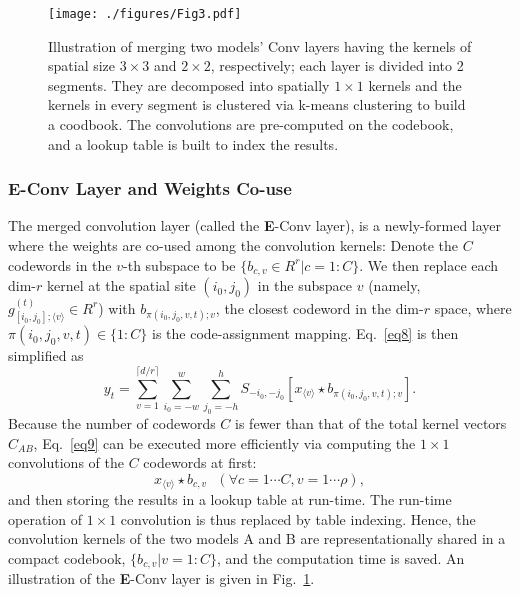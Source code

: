 \documentclass{article}
\begin{document}
	
	\begin{figure}[t]
		\begin{center}
			\texttt{[image: ./figures/Fig3.pdf]}
		\end{center}
		\vspace{-0.3cm}
		\caption{Illustration of merging two models' Conv layers having the kernels of spatial size $3\times3$ and $2\times 2$, respectively; each layer is divided into 2 segments. They are decomposed into spatially $1\times 1$ kernels and the kernels in every segment is clustered via k-means clustering to build a coodbook. The convolutions are pre-computed on the codebook, and a lookup table is built to index the results.}
		\label{fig:decomposition}
	\end{figure}
	
	\subsubsection{E-Conv Layer and Weights Co-use}
	\label{sec:merge}
	The merged convolution layer (called the \textbf{E}-Conv layer), is a newly-formed layer where the weights are co-used among the convolution kernels:
	Denote the $C$ codewords in the $v$-th subspace to be $\{b_{c,v}\in R^r|c=1:C\}$.
	We then replace each dim-$r$ kernel at the spatial site $(i_0,j_0)$ in the subspace $v$ (namely, $g_{[i_0,j_0];\langle v \rangle}^{(t)}\in R^r$) with $b_{\pi(i_0,j_0,v,t);v}$, the closest codeword in the dim-$r$ space, where $\pi(i_0,j_0,v,t)\in\{1:C\}$ is the code-assignment mapping.
	Eq.~\ref{eq8} is then simplified as
	\begin{equation}
	\label{eq9}
	y_t =\sum_{v=1}^{\lceil d/r \rceil}\sum_{i_0=-w}^{w}\sum_{j_0=-h}^{h} S_{-i_0, -j_0}[x_{\langle v \rangle} \star b_{\pi(i_0,j_0,v,t);v}].
	\end{equation}
	Because the number of codewords $C$ is fewer than that of the total kernel vectors $C_{AB}$, Eq.~\ref{eq9} can be executed more efficiently via computing the $1\times1$ convolutions of the $C$ codewords at first:
	\begin{equation}
	\label{eq10}
	x_{\langle v \rangle} \star b_{c,v}~~~(\forall c=1 \cdots C, v=1 \cdots \rho),
	\end{equation}
	and then storing the results in a lookup table at run-time.
	The run-time operation of $1\times1$ convolution is thus replaced by table indexing.
	Hence, the convolution kernels of the two models A and B are representationally shared in a compact codebook, $\{b_{c,v}|v=1:C\}$, and the computation time is saved.
	An illustration of the \textbf{E}-Conv layer is given in Fig.~\ref{fig:decomposition}.
	
\end{document}
